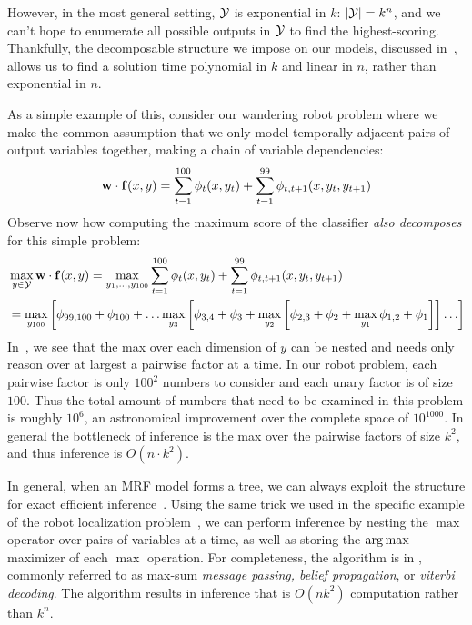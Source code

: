 However, in the most general setting, $\mathcal{Y}$ is exponential in 
$k$: $|\mathcal{Y}| = k^n$, and we can't hope to enumerate all possible outputs in 
$\mathcal{Y}$ to find the highest-scoring.  Thankfully, the decomposable structure we 
impose on our models, discussed in~, allows us to find a solution 
time polynomial in $k$ and linear in $n$, rather than exponential in $n$.
 

As a simple example of this, consider our wandering robot problem where we make 
the common assumption that we only model temporally adjacent pairs of output 
variables together, making a chain of variable dependencies:
\begin{equation*}
\mathbf{w} \cdot \mathbf{f}(x,y) = \sum_{t=1}^{100} \phi_t(x,y_t) + \sum_{t=1}^{99} 
\phi_{t,t+1}(x,y_t,y_{t+1})
\end{equation*}
Observe now how computing the maximum score of the classifier {\em also 
decomposes} for this simple problem:
\begin{align}
&\max_{y \in \mathcal{Y}} \mathbf{w} \cdot \mathbf{f}(x,y) = \max_{y_1,\ldots,y_{100}} 
\sum_{t=1}^{100} \phi_t(x,y_t) + \sum_{t=1}^{99} \phi_{t,t+1}(x,y_t,y_{t+1}) \\
&= \max_{y_{100}} \left[ \phi_{99,100} + \phi_{100} + \ldots \max_{y_3} \left[\phi_{3,4} + \phi_3 +  \max_{y_2} \left[ \phi_{2,3} + \phi_2 + \max_{y_1} \phi_{1,2} + \phi_1 \right] \right] \ldots \right] 
\label{eq:nesting} \end{align} 
In~, we see that the max over each dimension of $y$ can be
nested and needs only reason over at largest a pairwise factor at a time.  In our robot problem,
each pairwise factor is only $100^2$ numbers to consider and each unary factor is of size $100$. Thus the total amount of numbers that need to be examined in this problem is roughly $10^6$, an astronomical improvement over the complete space of $10^{1000}$. In general the bottleneck of inference is the max over the pairwise factors of size $k^2$, and thus inference is $O(n \cdot k^2)$.

In general, when an MRF model forms a tree, we can always exploit the structure for exact efficient 
inference~\citep{koller-book}.  Using the same trick we used in the specific 
example of the robot localization problem~, we can perform 
inference by nesting the $\max$ operator over pairs of variables at a time, as 
well as storing the $\mathop{\arg\max}$ maximizer of each $\max$ operation.  For 
completeness, the algorithm is in , commonly referred to 
as max-sum {\em message passing, belief propagation}, or {\em viterbi 
decoding}.  The algorithm results in inference that is $O(nk^2)$ computation 
rather than $k^n$.

